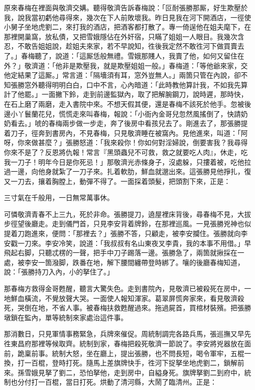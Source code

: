 原來春梅在裡面與敬濟交媾。聽得敬濟告訴春梅說：「叵耐張勝那厮，好生欺壓於我，說我當初虧他尋得來，幾次在下人前敗壞我。昨日見我在河下開酒店，一徑使小舅子坐地虎劉二，來打我的酒店，把酒客都打散了。專一倚逞他在姐夫麾下，在那裡開巢窩，放私債，又把雪娥隱佔在外奸宿，只瞞了姐姐一人眼目。我幾次含忍，不敢告姐姐說，趁姐夫來家，若不早說知，徃後我定然不敢徃河下做買賣去了。」春梅聽了，說道：「這厮恁般無禮。雪娥那賤人，我賣了他，如何又留住在外？」敬濟道：「他非是欺壓我，就是欺壓姐姐一般。」春梅道：「等他爺來家，交他定結果了這厮。」{}常言道：「隔墻須有耳，窓外豈無人。」兩箇只管在內說，卻不知張勝窓外聽得明明白白，口中不言，心內暗道：「此時教他算計我，不如我先算計了他罷。」{}一面撇下鈴，走到前邊監獄內，取了把解腕鋼刀，說時遲，那時快，在石上磨了兩磨，走入書院中來。不想天假其便，還是春梅不該死於他手。忽被後邊小丫鬟蘭花兒，慌慌走來叫春梅，報說：「小衙內金哥兒忽然風搖倒了，快請奶奶看去。」唬的春梅兩步做一步走，奔了後房中看孩兒去了。剛進去了，那張勝提着刀子，徑奔到書房內，不見春梅，只見敬濟睡在被窩內。見他進來，叫道：「阿呀，你來做甚麼？」張勝怒道：「我來殺你！{}你如何對淫婦說，倒要害我？我尋得你來不是了？反恩將仇報！常言『黑頭蟲兒不可救，救之就要吃人肉』，休走，吃我一刀子！明年今日是你死忌！」{}那敬濟光赤條身子，沒處躲，只摟着被，吃他拉過一邊，向他身就紮了一刀子來。扎着軟肋，鮮血就邈出來。這張勝見他掙扎，復又一刀去，攘着胸膛上，動彈不得了。一面採着頭髮，把頭割下來，{}正是：

三寸氣在千般用，一日無常萬事休。

可憐敬濟青春不上三九，死於非命。張勝提刀，遶屋裡床背後，尋春梅不見，大拔步徑望後廳走。走到儀門首，只見李安背着牌鈴，在那裡巡風。一見張勝兇神也似提着刀跑進來，便問：「那裡去？」張勝不答，只顧走，被李安攔住。張勝就向李安戳一刀來。李安冷笑，說道：「我叔叔有名山東夜叉李貴，我的本事不用借。」早飛起右脚，只聽忒楞的一聲，把手中刀子踢落一邊。{}張勝急了，兩箇就揪採在一處，被李安一箇潑脚，跌番在地，解下腰間纏帶登時綁了。嚷的後廳春梅知道，說：「張勝持刀入內，小的拏住了。」

那春梅方救得金哥甦醒，聽言大驚失色。走到書院內，見敬濟已被殺死在房中，一地鮮血橫流，不覺放聲大哭。一面使人報知渾家。葛翠屏慌奔家來，看見敬濟殺死，哭倒在地，不省人事。被春梅扶救甦醒過來。拖過屍首，買棺材裝殯。把張勝墩鎖在監內，單等統制來家處治這件事。

那消數日，只見軍情事務緊急，兵牌來催促。周統制調完各路兵馬，張巡撫又早先徃東昌府那裡等候取齊。統制到家，春梅把殺死敬濟一節說了。李安將兇器放在面前，跪稟前事。統制大怒，坐在廳上，提出張勝，也不問長短，喝令軍牢，五棍一換，打一百棍，登時打死。隨馬上差旗牌快手，徃河下捉拏坐地虎劉二，鎖解前來。孫雪娥見拏了劉二，恐怕拏他，走到房中，自縊身死。旗牌拏劉二到府中，統制也分付打一百棍，當日打死。{}烘動了清河縣，大鬧了臨清州。正是：

